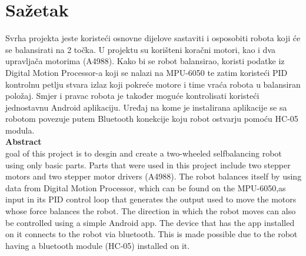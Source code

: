 \documentclass[../Document.tex]{subfiles}
\begin{document}
\section{Sažetak}

Svrha projekta jeste koristeći osnovne dijelove sastaviti i osposobiti robota koji će se balansirati na 2 točka. U projektu su korišteni koračni motori, kao i dva upravljača motorima (A4988). Kako bi se robot balansirao, koristi podatke iz Digital Motion Processor-a koji se nalazi na MPU-6050 te zatim koristeći PID kontrolnu petlju stvara izlaz koji pokreće motore i time vraća robota u balansiran položaj. Smjer i pravac robota je također moguće kontrolisati koristeći jednostavnu Android aplikaciju. Uređaj na kome je instalirana aplikacije se sa robotom povezuje putem Bluetooth konekcije koju robot ostvarju pomoću HC-05 modula.\\

{\Large \noindent \textbf{ Abstract}}\\

\noindent goal of this project is to desgin and create a two-wheeled selfbalancing robot using only basic parts. Parts that were used in this project include two stepper motors and two stepper motor drivers (A4988). The robot balances itself by using data from Digital Motion Processor, which can be found on the MPU-6050,as input in its PID control loop that generates the output used to move the motors whose force balances the robot. The direction in which the robot moves can also be controlled using a simple Android app. The device that has the app installed on it connects to the robot via bluetooth. This is made possible due to the robot having a bluetooth module (HC-05) installed on it.
\end{document}
